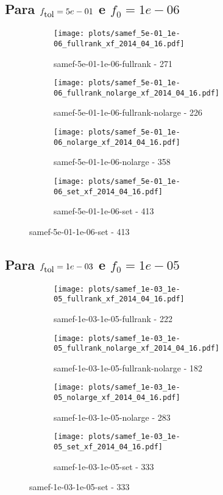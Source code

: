 \newpage
\subsection{Para $f_{\mbox{tol}} = 5e-01$ e $f_0 = 1e-06$}

\begin{figure}[H]
  \centering
  \begin{subfigure}{0.48\textwidth}
    \texttt{[image: plots/samef\_5e-01\_1e-06\_fullrank\_xf\_2014\_04\_16.pdf]}
    \caption{samef-5e-01-1e-06-fullrank - 271}
  \end{subfigure}
  \begin{subfigure}{0.48\textwidth}
    \texttt{[image: plots/samef\_5e-01\_1e-06\_fullrank\_nolarge\_xf\_2014\_04\_16.pdf]}
    \caption{samef-5e-01-1e-06-fullrank-nolarge - 226}
  \end{subfigure}
  \begin{subfigure}{0.48\textwidth}
    \texttt{[image: plots/samef\_5e-01\_1e-06\_nolarge\_xf\_2014\_04\_16.pdf]}
    \caption{samef-5e-01-1e-06-nolarge - 358}
  \end{subfigure}
  \begin{subfigure}{0.48\textwidth}
    \texttt{[image: plots/samef\_5e-01\_1e-06\_set\_xf\_2014\_04\_16.pdf]}
    \caption{samef-5e-01-1e-06-set - 413}
  \end{subfigure}
\end{figure}

\newpage
\subsection{Para $f_{\mbox{tol}} = 1e-03$ e $f_0 = 1e-05$}

\begin{figure}[H]
  \centering
  \begin{subfigure}{0.48\textwidth}
    \texttt{[image: plots/samef\_1e-03\_1e-05\_fullrank\_xf\_2014\_04\_16.pdf]}
    \caption{samef-1e-03-1e-05-fullrank - 222}
  \end{subfigure}
  \begin{subfigure}{0.48\textwidth}
    \texttt{[image: plots/samef\_1e-03\_1e-05\_fullrank\_nolarge\_xf\_2014\_04\_16.pdf]}
    \caption{samef-1e-03-1e-05-fullrank-nolarge - 182}
  \end{subfigure}
  \begin{subfigure}{0.48\textwidth}
    \texttt{[image: plots/samef\_1e-03\_1e-05\_nolarge\_xf\_2014\_04\_16.pdf]}
    \caption{samef-1e-03-1e-05-nolarge - 283}
  \end{subfigure}
  \begin{subfigure}{0.48\textwidth}
    \texttt{[image: plots/samef\_1e-03\_1e-05\_set\_xf\_2014\_04\_16.pdf]}
    \caption{samef-1e-03-1e-05-set - 333}
  \end{subfigure}
\end{figure}

